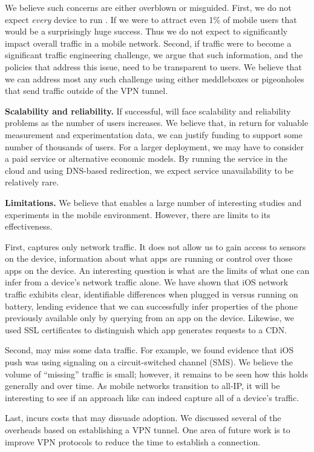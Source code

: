 We believe such concerns are either overblown or misguided. First, we do not 
expect \emph{every} device to run \meddle. If we were to attract even 1\% of 
mobile users that would be a surprisingly huge success. Thus we do not expect 
\meddle to significantly impact overall traffic in a mobile network. Second, if \meddle 
traffic were to become a significant traffic engineering challenge, we argue that 
such information, and the policies that address this issue, need to be 
transparent to users. We believe that we can address most any such challenge 
using either meddleboxes or pigeonholes that send traffic outside of the VPN 
tunnel. 

\noindent\textbf{Scalability and reliability.} If successful, \meddle will 
face scalability and reliability problems as the number of users increases. 
We believe that, in return for valuable measurement and experimentation data, 
we can justify funding to support some number of thousands of users. For a 
larger deployment, we may have to consider a paid service or alternative 
economic models. By running the service in the cloud and using DNS-based 
redirection, we expect service unavailability to be relatively rare. 

\noindent\textbf{Limitations.} We believe that \meddle enables a large number 
of interesting studies and experiments in the mobile environment. However, 
there are limits to its effectiveness. 

First, \meddle captures only network traffic. It does 
not allow us to gain access to sensors on the device, information about what 
apps are running or control over those apps on the device. An interesting question 
is what are the limits of what one can infer from a device's network traffic alone. 
We have shown that iOS network traffic exhibits clear, identifiable differences 
when plugged in versus running on battery, lending evidence that we can successfully 
infer properties of the phone previously available only by querying from an app 
on the device. Likewise, we used SSL certificates to distinguish which app generates 
requests to a CDN.

Second, \meddle may miss some data traffic. For example, we found evidence that 
iOS push was using signaling on a circuit-switched channel (SMS). We believe 
the volume of ``missing'' traffic is small; however, it remains to be seen how 
this holds generally and over time. As mobile networks transition to all-IP, it will 
be interesting to see if an approach like \meddle can indeed capture all of a device's traffic.

Last, \meddle incurs costs that may dissuade adoption. We discussed several of the 
overheads based on establishing a VPN tunnel. One area of future work is to improve 
VPN protocols to reduce the time to establish a connection. 
